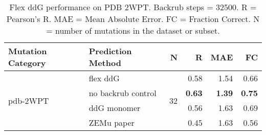 \begin{table}
  \begin{tabular}{llrrrr}
\toprule
Mutation Category &   Prediction Method &   N &    R &  MAE &   FC \\
\midrule
 \multirow{ 4}{*}{pdb-2WPT} & flex ddG & \multirow{ 4}{*}{32} & 0.58 & 1.54 & 0.66  \\
 & no backrub control & & \textbf{0.63} & \textbf{1.39} & \textbf{0.75}  \\
 & ddG monomer & & 0.56 & 1.63 & 0.69  \\
 & ZEMu paper & & 0.45 & 1.63 & 0.56  \\
\bottomrule
\end{tabular}
  \caption[Flex ddG performance on PDB 2WPT]{
    Flex ddG performance on PDB 2WPT. Backrub steps = 32500. R = Pearson's R. MAE = Mean Absolute Error. FC = Fraction Correct. N = number of mutations in the dataset or subset.
  } \label{tab:table-pdb-2WPT}
\end{table}

